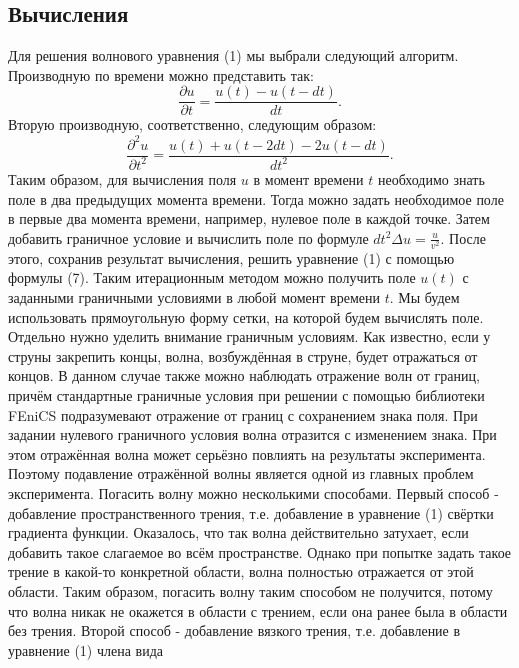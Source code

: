 \documentclass[
11pt,%
tightenlines,%
twoside,%
onecolumn,%
nofloats,%
nobibnotes,%
nofootinbib,%
superscriptaddress,%
noshowpacs,%
centertags]%
{revtex4}
\begin{document}
\subsection{Вычисления}
Для решения волнового уравнения (1) мы выбрали следующий алгоритм. Производную по времени можно
представить так:
\begin{equation}
    \frac{\partial u}{\partial t} = \frac{u(t) - u(t-dt)}{dt}.
\end{equation}
Вторую производную, соответственно, следующим образом:
\begin{equation}
    \frac{\partial^2u}{\partial t^2} = \frac{u(t) + u(t-2dt) - 2u(t-dt)}{dt^2}.
\end{equation}
Таким образом, для вычисления поля $u$ в момент времени $t$ необходимо знать поле в два предыдущих
момента времени. Тогда можно задать необходимое поле в первые два момента времени, например, нулевое
поле в каждой точке. Затем добавить граничное условие и вычислить поле по формуле $dt^2 \Delta u = 
\frac{u}{v^2}$. После этого, сохранив результат вычисления, решить уравнение (1) с помощью формулы
(7). Таким итерационным методом можно получить поле $u(t)$ с заданными граничными условиями
в любой момент времени $t$. Мы будем использовать прямоугольную форму сетки, на которой будем 
вычислять поле. \newline
Отдельно нужно уделить внимание граничным условиям. Как известно, если у струны закрепить концы, 
волна, возбуждённая в струне, будет отражаться от концов. В данном случае также можно наблюдать
отражение волн от границ, причём стандартные граничные условия при решении с помощью библиотеки
FEniCS подразумевают отражение от границ с сохранением знака поля. При задании нулевого граничного
условия волна отразится с изменением знака. При этом отражённая волна может серьёзно повлиять
на результаты эксперимента. Поэтому подавление отражённой волны является одной из главных проблем
эксперимента. \newline
Погасить волну можно несколькими способами. Первый способ - добавление пространственного трения, 
т.е. добавление в уравнение (1) свёртки градиента функции. Оказалось, что так волна действительно
затухает, если добавить такое слагаемое во всём пространстве. Однако при попытке задать такое трение
в какой-то конкретной области, волна полностью отражается от этой области. Таким образом, погасить
волну таким способом не получится, потому что волна никак не окажется в области с трением, если она 
ранее была в области без трения. \newline
Второй способ - добавление вязкого трения, т.е. добавление в уравнение (1) члена вида 
\end{document}
